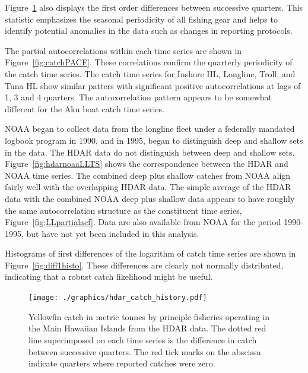 \documentclass[12pt,letterpaper,twoside]{article}
\begin{document}
Figure~\ref{fig:hdarTS} also displays the first order differences
between successive quarters. This statistic emphasizes the seasonal
periodicity of all fishing gear and helps to identify potential anomalies in
the data such as changes in reporting protocols. 

The partial autocorrelations within each time
series are shown in Figure~\ref{fig:catchPACF}. These correlations
confirm the quarterly periodicity  of the catch time series.
The catch time series for Inshore HL, Longline, Troll, and Tuna HL show
similar patters with
significant positive autocorrelations at lags of 1, 3 and 4 quarters.
The autocorrelation pattern appears to be somewhat different for the Aku
boat catch time series.

NOAA began to collect data from the longline fleet under a federally
mandated logbook program in 1990, and in 1995, began to distinguish
deep and shallow sets in the data. The HDAR data do not
distinguish between deep and shallow sets.
Figure~\ref{fig:hdarnoaaLLTS} shows the correspondence between the
HDAR and NOAA time series. The combined deep plus shallow catches from
NOAA align fairly well with the overlapping HDAR data. The simple
average of the HDAR data with the combined NOAA deep plus shallow data
appears to have roughly the same autocorrelation structure as the
constituent time series, Figure~\ref{fig:LLpartialacf}.
Data are also available from NOAA for the period 1990-1995, but
have not yet been included in this analysis.

Histograms of first differences of the logarithm of catch time series
are shown in Figure~\ref{fig:diff1histo}. These differences are
clearly not normally distributed, indicating that a robust catch
likelihood might be useful.

\begin{figure}
\begin{center}
\texttt{[image: ./graphics/hdar\_catch\_history.pdf]}
\caption{\label{fig:hdarTS}
Yellowfin catch in metric tonnes by principle fisheries operating in
the Main Hawaiian Islands from the HDAR data.
The dotted red line superimposed on each time series is the difference in
catch between successive quarters.
The red tick marks on the abscissa indicate quarters where reported
catches were zero.
}
\end{center}
\end{figure}
\end{document}
